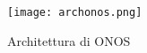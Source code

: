 \begin{figure}[h]
    \centering
   \texttt{[image: archonos.png]}
    \caption{Architettura di ONOS}
    \label{fig:img3}
\end{figure}




